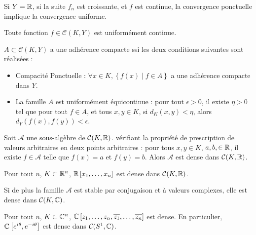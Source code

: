 \documentclass{cours}
\begin{document}
\begin{theorem}[De Dini]
    Si $Y = \mathbb{R}$, si la suite $f_{n}$ est croissante, et $f$ est continue, la convergence ponctuelle implique la convergence uniforme.
\end{theorem}

\begin{theorem}[De Heine]
    Toute fonction $f \in \mathcal{C}(K, Y)$ est uniformément continue.
\end{theorem}

\begin{theorem}\label{thm:Ascoli}
    $A \subset \mathcal{C}(K, Y)$ a une adhérence compacte ssi les deux conditions suivantes sont réalisées :
    \begin{itemize}
        \item Compacité Ponctuelle : $\forall x \in K, \left\{f(x)\mid f \in A\right\}$ a une adhérence compacte dans $Y$.
        \item La famille $A$ est uniformément équicontinue : pour tout $\epsilon > 0$, il existe $\eta > 0$ tel que pour tout $f \in A$, et tous $x, y \in K$, si $d_{K}(x, y) < \eta$, alors $d_{Y}(f(x), f(y)) < \epsilon$.
    \end{itemize}
\end{theorem}

\begin{theorem}\label{thm:Stone-Weierstrass}
    Soit $\mathcal{A}$ une sous-algèbre de $\mathcal{C}(K, \mathbb{R})$. vérifiant la propriété de prescription de valeurs arbitraires en deux points arbitraires : pour tous $x, y \in K$, $a, b,\in \mathbb{R}$, il existe $f \in \mathcal{A}$ telle que $f(x) = a$ et $f(y) = b$. Alors $\mathcal{A}$ est dense dans $\mathcal{C}(K, \mathbb{R})$.
\end{theorem}

\begin{corollary}
    Pour tout $n$, $K \subset \mathbb{R}^{n}$, $\mathbb{R}\left[x_{1}, \ldots, x_{n}\right]$ est dense dans $\mathcal{C}(K, \mathbb{R})$.
\end{corollary}

\begin{corollary}
    Si de plus la famille $\mathcal{A}$ est stable par conjugaison et à valeurs complexes, elle est dense dans $\mathcal{C}(K, \mathbb{C})$.
\end{corollary}

\begin{corollary}
    Pour tout $n$, $K\subset \mathbb{C}^{n}$, $\mathbb{C}\left[z_{1}, \ldots, z_{n}, \overline{z_{1}}, \ldots, \overline{z_{n}}\right]$ est dense. En particulier, $\mathbb{C}\left[e^{i\theta}, e^{-i\theta}\right]$ est dense dans $\mathcal{C}(S^{1}, \mathbb{C})$.
\end{corollary}
\end{document}
